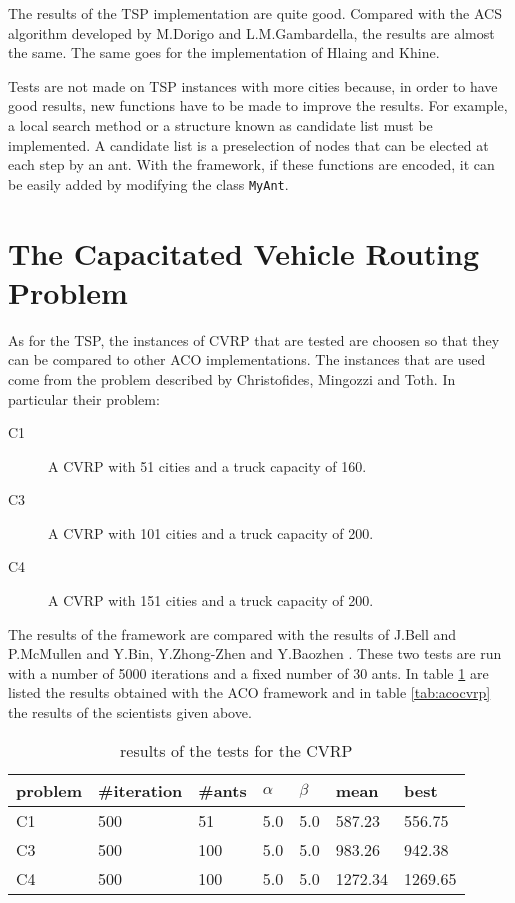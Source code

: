 The results of the TSP implementation are quite good. Compared with the ACS algorithm developed by M.Dorigo and L.M.Gambardella, the results are almost the same. The same goes for the implementation of Hlaing and Khine.

Tests are not made on TSP instances with more cities because, in order to have good results, new functions have to be made to improve the results. For example, a local search method or a structure known as candidate list must be implemented. A candidate list is a preselection of nodes that can be elected at each step by an ant. With the framework, if these functions are encoded, it can be easily added by modifying the class \texttt{MyAnt}.

\section{The Capacitated Vehicle Routing Problem}\label{testcvrp}
As for the TSP, the instances of CVRP that are tested are choosen so that they can be compared to other ACO implementations. The instances that are used come from the problem described by Christofides, Mingozzi and Toth. In particular their problem: 
\begin{description}
	\item [C1] A CVRP with 51 cities and a truck capacity of 160.
	\item [C3] A CVRP with 101 cities and a truck capacity of 200.
	\item [C4] A CVRP with 151 cities and a truck capacity of 200.
\end{description}
The results of the framework are compared with the results of J.Bell and P.McMullen \cite{bell2004ant} and Y.Bin, Y.Zhong-Zhen and Y.Baozhen \cite{yu2009improved}. These two tests are run with a number of 5000 iterations and a fixed number of 30 ants. In table \ref{tab:mycvrp} are listed the results obtained with the ACO framework and in table \ref{tab:acocvrp} the results of the scientists given above.

\begin{table}[h]
\centering
\small
\begin{tabular}{|l|l|l|l|l|l|l|}
\hline
problem & \#iteration & \#ants & $\alpha$ & $\beta$ & mean & best \\
\hline
\hline
C1 & 500 & 51 & 5.0 & 5.0 & 587.23 & 556.75  \\
\hline
C3 & 500 & 100 & 5.0 & 5.0 & 983.26 & 942.38  \\
\hline
C4 & 500 & 100 & 5.0 & 5.0 & 1272.34 & 1269.65 \\
\hline

\end{tabular}
\caption{results of the tests for the CVRP}
\label{tab:mycvrp}
\end{table}

